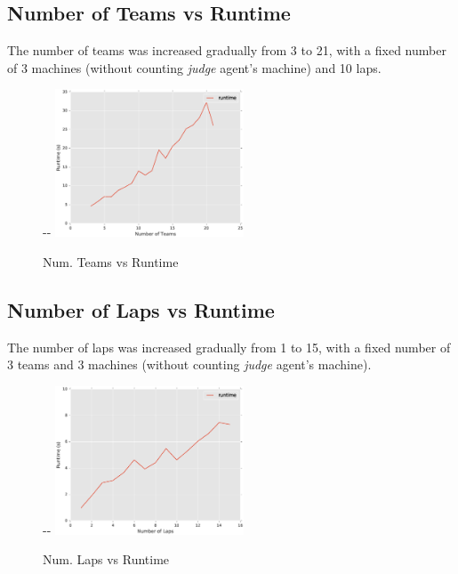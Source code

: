 \documentclass[11pt,titlepage]{article}
\newlength{\offsetpage}
\newenvironment{widepage}{
	\begin{adjustwidth}{-\offsetpage}{-\offsetpage}%
    \addtolength{\textwidth}{2\offsetpage}}%
	{\end{adjustwidth}
}
\begin{document}
\subsection{Number of Teams vs Runtime}

The number of teams was increased gradually from 3 to 21, with a fixed number of 3 machines (without counting \emph{judge} agent's machine) and 10 laps.

\begin{figure}[H]
	\begin{widepage}
		\centering
		\includegraphics[width=0.5\textwidth]{teams.eps}
	\end{widepage}
	\caption{Num. Teams vs Runtime}
	\label{fig:Teams-Runtime}
\end{figure}

\subsection{Number of Laps vs Runtime}

The number of laps was increased gradually from 1 to 15, with a fixed number of 3 teams and 3 machines (without counting \emph{judge} agent's machine).

\begin{figure}[H]
	\begin{widepage}
		\centering
		\includegraphics[width=0.5\textwidth]{laps.eps}
	\end{widepage}
	\caption{Num. Laps vs Runtime}
	\label{fig:Laps-Runtime}
\end{figure}
\end{document}
